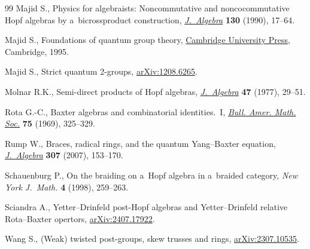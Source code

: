 \documentclass[10pt,a4paper]{amsart}
\numberwithin{equation}{section}
\begin{document}
\begin{thebibliography}{99}
Majid S., Physics for algebraists: {N}oncommutative and noncocommutative {H}opf
 algebras by a~bicrossproduct construction, \href{https://doi.org/10.1016/0021-8693(90)90099-A}{\textit{J.~Algebra}} \textbf{130}
 (1990), 17--64.

Majid S., Foundations of quantum group theory, \href{https://doi.org/10.1017/CBO9780511613104}{Cambridge University Press},
 Cambridge, 1995.

Majid S., Strict quantum 2-groups, \href{https://arxiv.org/abs/1208.6265}{arXiv:1208.6265}.

Molnar R.K., Semi-direct products of {H}opf algebras, \href{https://doi.org/10.1016/0021-8693(77)90208-3}{\textit{J.~Algebra}}
 \textbf{47} (1977), 29--51.

Rota G.-C., Baxter algebras and combinatorial identities.~{I}, \href{https://doi.org/10.1090/S0002-9904-1969-12156-7}{\textit{Bull.
 Amer. Math. Soc.}} \textbf{75} (1969), 325--329.

Rump W., Braces, radical rings, and the quantum {Y}ang--{B}axter equation,
 \href{https://doi.org/10.1016/j.jalgebra.2006.03.040}{\textit{J.~Algebra}} \textbf{307} (2007), 153--170.

Schauenburg P., On the braiding on a~{H}opf algebra in a~braided category,
 \textit{New York J.~Math.} \textbf{4} (1998), 259--263.

Sciandra A., {Y}etter--{D}rinfeld post-Hopf algebras and {Y}etter--{D}rinfeld
 relative {R}ota--{B}axter opertors, \href{https://arxiv.org/abs/2407.17922}{arXiv:2407.17922}.

Wang S., (Weak) twisted post-groups, skew trusses and rings,
 \href{https://arxiv.org/abs/2307.10535}{arXiv:2307.10535}.

\end{thebibliography}
\end{document}
